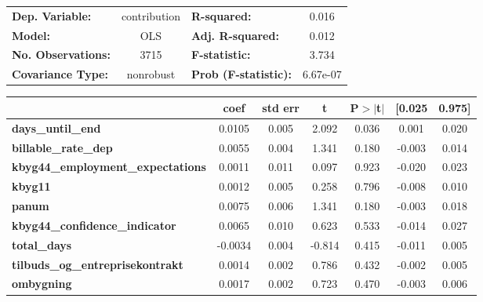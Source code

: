 \begin{center}
\begin{tabular}{lclc}
\toprule
\textbf{Dep. Variable:}                   &  contribution & \textbf{  R-squared:         } &     0.016   \\
\textbf{Model:}                           &      OLS      & \textbf{  Adj. R-squared:    } &     0.012   \\
\textbf{No. Observations:}                &       3715    & \textbf{  F-statistic:       } &     3.734   \\
\textbf{Covariance Type:}                 &   nonrobust   & \textbf{  Prob (F-statistic):} &  6.67e-07   \\
\bottomrule
\end{tabular}
\begin{tabular}{lcccccc}
                                          & \textbf{coef} & \textbf{std err} & \textbf{t} & \textbf{P$> |$t$|$} & \textbf{[0.025} & \textbf{0.975]}  \\
\midrule
\textbf{days\_until\_end}                 &       0.0105  &        0.005     &     2.092  &         0.036        &        0.001    &        0.020     \\
\textbf{billable\_rate\_dep}              &       0.0055  &        0.004     &     1.341  &         0.180        &       -0.003    &        0.014     \\
\textbf{kbyg44\_employment\_expectations} &       0.0011  &        0.011     &     0.097  &         0.923        &       -0.020    &        0.023     \\
\textbf{kbyg11}                           &       0.0012  &        0.005     &     0.258  &         0.796        &       -0.008    &        0.010     \\
\textbf{panum}                            &       0.0075  &        0.006     &     1.341  &         0.180        &       -0.003    &        0.018     \\
\textbf{kbyg44\_confidence\_indicator}    &       0.0065  &        0.010     &     0.623  &         0.533        &       -0.014    &        0.027     \\
\textbf{total\_days}                      &      -0.0034  &        0.004     &    -0.814  &         0.415        &       -0.011    &        0.005     \\
\textbf{tilbuds\_og\_entreprisekontrakt}  &       0.0014  &        0.002     &     0.786  &         0.432        &       -0.002    &        0.005     \\
\textbf{ombygning}                        &       0.0017  &        0.002     &     0.723  &         0.470        &       -0.003    &        0.006     \\

\end{tabular}
\end{center}
